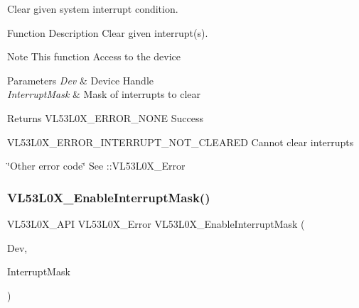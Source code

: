Clear given system interrupt condition. 

\begin{DoxyParagraph}{Function Description}
Clear given interrupt(s).
\end{DoxyParagraph}
\begin{DoxyNote}{Note}
This function Access to the device
\end{DoxyNote}

\begin{DoxyParams}{Parameters}
{\em Dev} & Device Handle \\
\hline
{\em Interrupt\+Mask} & Mask of interrupts to clear \\
\hline
\end{DoxyParams}
\begin{DoxyReturn}{Returns}
V\+L53\+L0\+X\+\_\+\+E\+R\+R\+O\+R\+\_\+\+N\+O\+NE Success 

V\+L53\+L0\+X\+\_\+\+E\+R\+R\+O\+R\+\_\+\+I\+N\+T\+E\+R\+R\+U\+P\+T\+\_\+\+N\+O\+T\+\_\+\+C\+L\+E\+A\+R\+ED Cannot clear interrupts

\char`\"{}\+Other error code\char`\"{} See \+::\+V\+L53\+L0\+X\+\_\+\+Error 
\end{DoxyReturn}
\mbox{\label{group__VL53L0X__interrupt__group_ga882a69f683b24cb8102a5071ed0becf7}} 
\subsubsection{\texorpdfstring{V\+L53\+L0\+X\+\_\+\+Enable\+Interrupt\+Mask()}{VL53L0X\_EnableInterruptMask()}}
{\footnotesize\ttfamily V\+L53\+L0\+X\+\_\+\+A\+PI V\+L53\+L0\+X\+\_\+\+Error V\+L53\+L0\+X\+\_\+\+Enable\+Interrupt\+Mask (\begin{DoxyParamCaption}\item[{\hyperlink{group__VL53L0X__platform__group_ga2d6405308b1dd524b462f1b8fb97d167}{V\+L53\+L0\+X\+\_\+\+D\+EV}}]{Dev,  }\item[{\hyperlink{vl53l0x__types_8h_a435d1572bf3f880d55459d9805097f62}{uint32\+\_\+t}}]{Interrupt\+Mask }\end{DoxyParamCaption})}



